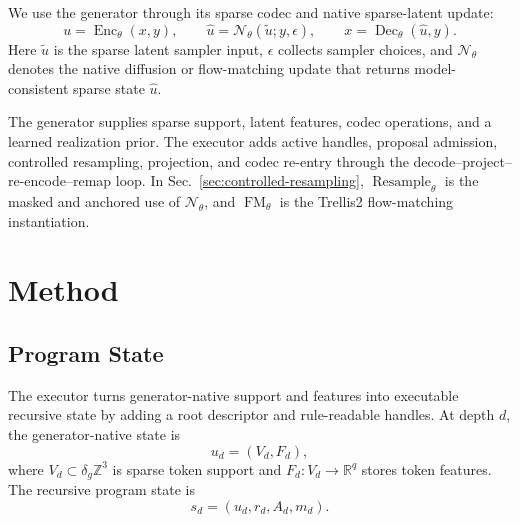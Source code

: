\documentclass[acmtog,anonymous,review]{acmart}
\begin{document}
We use the generator through its sparse codec and native sparse-latent update:
\begin{equation}
u=\operatorname{Enc}_{\theta}(x,y),\qquad
\widehat u=\mathcal N_{\theta}(\tilde u;y,\epsilon),\qquad
x=\operatorname{Dec}_{\theta}(\widehat u,y).
\end{equation}
Here $\tilde u$ is the sparse latent sampler input, $\epsilon$ collects sampler choices, and $\mathcal N_{\theta}$ denotes the native diffusion or flow-matching update that returns model-consistent sparse state $\widehat u$.

The generator supplies sparse support, latent features, codec operations, and a learned realization prior. The executor adds active handles, proposal admission, controlled resampling, projection, and codec re-entry through the decode--project--re-encode--remap loop. In Sec.~\ref{sec:controlled-resampling}, $\operatorname{Resample}_\theta$ is the masked and anchored use of $\mathcal N_\theta$, and $\operatorname{FM}_\theta$ is the Trellis2 flow-matching instantiation.



\section{Method}

\subsection{Program State}
\label{sec:program-state}

The executor turns generator-native support and features into executable recursive state by adding a root descriptor and rule-readable handles. At depth $d$, the generator-native state is
\begin{equation}
u_d=(V_d,F_d),
\end{equation}
where $V_d\subset \delta_g\mathbb Z^3$ is sparse token support and $F_d:V_d\rightarrow\mathbb R^q$ stores token features. The recursive program state is
\begin{equation}
s_d=(u_d,r_d,A_d,m_d).
\end{equation}
\end{document}
